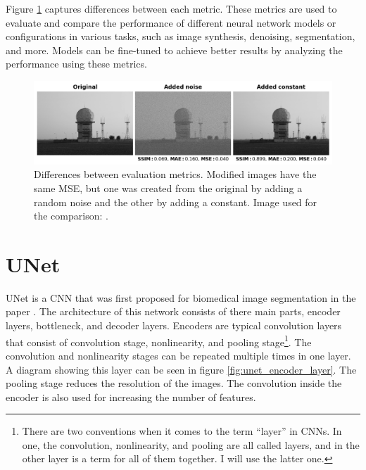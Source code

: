 Figure \ref{fig:metric} captures differences between each metric. These metrics are used to evaluate and compare the performance of different neural network models or configurations in various tasks, such as image synthesis, denoising, segmentation, and more. Models can be fine-tuned to achieve better results by analyzing the performance using these metrics.

\begin{figure}[ht]
    \centering
    \includegraphics[width=\textwidth]{images/metrics.png}
    \caption[Differences between evaluation metrics]{\label{fig:metric}Differences between evaluation metrics. Modified images have the same \gls{MSE}, but one was created from the original by adding a random noise and the other by adding a constant. Image used for the comparison: \cite{wiki}.}
\end{figure}

\section{UNet}
\label{sec:unet}

UNet is a \gls{CNN} that was first proposed for biomedical image segmentation in the paper \cite{unet}. The architecture of this network consists of there main parts, encoder layers, bottleneck, and decoder layers. Encoders are typical convolution layers that consist of convolution stage, nonlinearity, and pooling stage\footnote{There are two conventions when it comes to the term ``layer'' in \glspl{CNN}. In one, the convolution, nonlinearity, and pooling are all called layers, and in the other layer is a term for all of them together. I will use the latter one.}. The convolution and nonlinearity stages can be repeated multiple times in one layer. A diagram showing this layer can be seen in figure \ref{fig:unet_encoder_layer}. The pooling stage reduces the resolution of the images. The convolution inside the encoder is also used for increasing the number of features.

